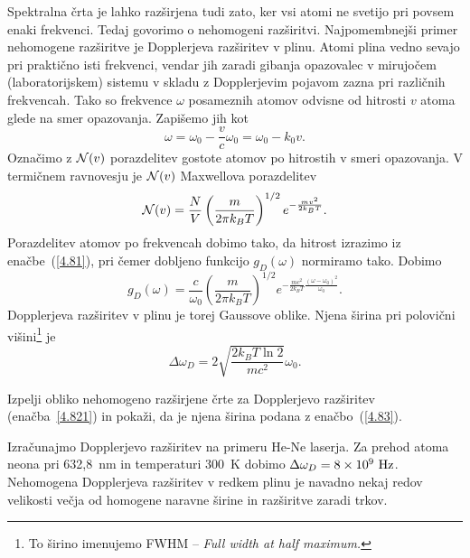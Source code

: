 \noindent
Spektralna črta je lahko razširjena tudi zato, ker vsi atomi ne svetijo
pri povsem enaki frekvenci. Tedaj govorimo o nehomogeni 
razširitvi.
Najpomembnejši primer nehomogene razširitve je Dopplerjeva 
 razširitev v plinu. 
Atomi plina vedno sevajo pri praktično isti frekvenci, vendar jih zaradi gibanja
opazovalec v mirujočem (laboratorijskem) sistemu v skladu z Dopplerjevim pojavom 
zazna pri različnih frekvencah. Tako so frekvence $\omega$ posameznih atomov 
odvisne od hitrosti $v$ atoma glede na smer opazovanja. Zapišemo jih kot  
\begin{equation}
\omega=\omega_{0}-\frac{v}{c}\omega_{0}=\omega_{0}-k_{0}v.
\label{4.81}
\end{equation}
Označimo z ${\cal N}(v)$ porazdelitev gostote atomov po hitrostih
v smeri opazovanja. V termičnem ravnovesju je ${\cal N}(v)$ Maxwellova
porazdelitev
\begin{equation}
{\cal N}(v)=\frac{N}{V}\left(\frac{m}{2\pi k_{B}T}\right)^{1/2}e^{-\frac{mv^{2}}{2k_{B}T}}.
\label{4.82}
\end{equation}
 Porazdelitev atomov po frekvencah dobimo tako, da hitrost izrazimo
iz enačbe~(\ref{4.81}), pri čemer dobljeno funkcijo $g_{D}(\omega)$
normiramo tako. Dobimo
\begin{equation}
g_{D}(\omega)=\frac{c}{\omega_{0}}\left(\frac{m}{2\pi 
k_{B}T}\right)^{1/2}e^{-\frac{mc^{2}}{2k_{B}T}\frac{(\omega-\omega_{0})^{2}}{\omega_{0}}}.
\label{4.821}
\end{equation}
Dopplerjeva razširitev v plinu je torej Gaussove oblike. Njena širina pri polovični 
višini\footnote{To širino imenujemo FWHM -- \it{Full width at half maximum}.} je
\begin{equation}
\Delta\omega_{D}=2 \sqrt{\frac{2k_{B}T \ln 2}{mc^{2}}}\omega_{0}.
\label{4.83}
\end{equation}
\begin{definition}
Izpelji obliko nehomogeno razširjene črte za Dopplerjevo razširitev (enačba~\ref{4.821})
in pokaži, da je njena širina podana z enačbo~(\ref{4.83}).
\end{definition}

\noindent
Izračunajmo Dopplerjevo razširitev na primeru He-Ne laserja. Za prehod
atoma neona pri 632,8~nm in temperaturi 300~K dobimo 
$\Delta\omega_{D}=8\times10^{9}~\hertz$. Nehomogena Dopplerjeva razširitev v 
redkem plinu je navadno nekaj redov velikosti večja od homogene naravne širine in 
razširitve zaradi trkov.

